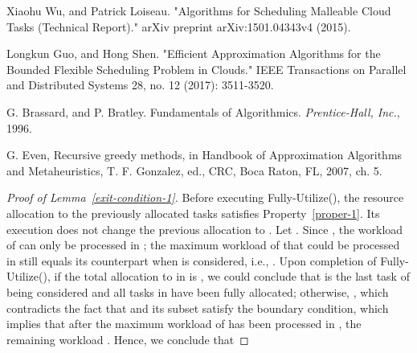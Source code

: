 \documentclass[10pt,journal,compsoc]{IEEEtran}
\begin{document}
\begin{thebibliography}{1}
Xiaohu Wu, and Patrick Loiseau. "Algorithms for Scheduling Malleable Cloud Tasks (Technical Report)." arXiv preprint arXiv:1501.04343v4 (2015).






Longkun Guo, and Hong Shen. "Efficient Approximation Algorithms for the Bounded Flexible Scheduling Problem in Clouds." IEEE Transactions on Parallel and Distributed Systems 28, no. 12 (2017): 3511-3520.










G. Brassard, and P. Bratley. Fundamentals of Algorithmics. {\em Prentice-Hall, Inc.}, 1996.

G. Even, Recursive greedy methods, in Handbook of Approximation Algorithms and Metaheuristics, T. F. Gonzalez, ed., CRC, Boca Raton, FL, 2007, ch. 5.


\end{thebibliography}

\appendix



\begin{proof}[Proof of Lemma~\ref{exit-condition-1}]
Before executing Fully-Utilize(), the resource allocation to the previously allocated tasks  satisfies Property~\ref{proper-1}. Its execution does not change the previous allocation to . Let . Since , the workload of  can only be processed in ; the maximum workload of  that could be processed in  still equals its counterpart when  is considered, i.e., . Upon completion of Fully-Utilize(), if the total allocation to  in  is , we could conclude that  is the last task of  being considered and all tasks in  have been fully allocated; otherwise, , which contradicts the fact that  and its subset satisfy the boundary condition, which implies that after the maximum workload of  has been processed in , the remaining workload . Hence, we conclude that
\end{proof}
\end{document}
